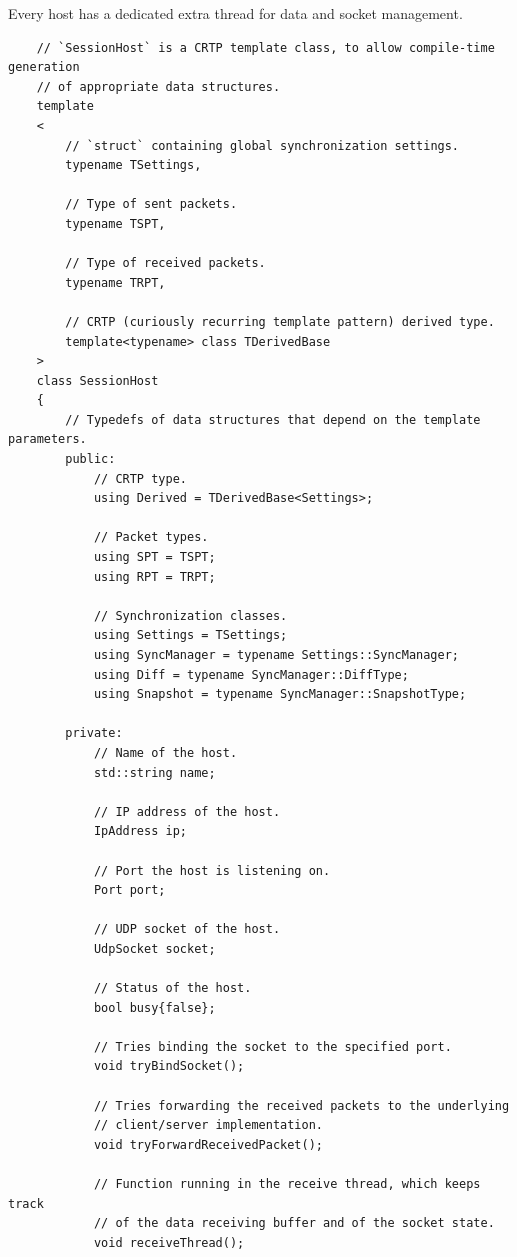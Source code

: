 \documentclass{report}
\begin{document}
            Every host has a dedicated extra thread for data and socket management.

\begin{verbatim}
    // `SessionHost` is a CRTP template class, to allow compile-time generation 
    // of appropriate data structures.
    template
    <
        // `struct` containing global synchronization settings.
        typename TSettings, 
        
        // Type of sent packets.
        typename TSPT, 
        
        // Type of received packets.
        typename TRPT, 

        // CRTP (curiously recurring template pattern) derived type.
        template<typename> class TDerivedBase
    > 
    class SessionHost
    {
        // Typedefs of data structures that depend on the template parameters.
        public:
            // CRTP type.
            using Derived = TDerivedBase<Settings>;

            // Packet types.
            using SPT = TSPT;
            using RPT = TRPT;
        
            // Synchronization classes.
            using Settings = TSettings;
            using SyncManager = typename Settings::SyncManager;
            using Diff = typename SyncManager::DiffType;
            using Snapshot = typename SyncManager::SnapshotType;

        private:
            // Name of the host.
            std::string name;
            
            // IP address of the host.
            IpAddress ip;

            // Port the host is listening on.
            Port port;

            // UDP socket of the host.
            UdpSocket socket;

            // Status of the host.
            bool busy{false};

            // Tries binding the socket to the specified port.
            void tryBindSocket();    

            // Tries forwarding the received packets to the underlying 
            // client/server implementation.
            void tryForwardReceivedPacket();
            
            // Function running in the receive thread, which keeps track
            // of the data receiving buffer and of the socket state.
            void receiveThread();


\end{verbatim}
\end{document}
